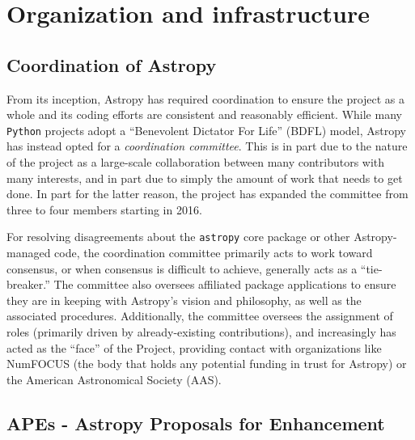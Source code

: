 \documentclass[modern]{aastex61}
\newcommand{\package}[1]{\texttt{#1}\xspace}
\newcommand{\python}{\package{Python}}
\newcommand{\astropy}{Astropy\xspace}
\newcommand{\astropypkg}{\package{astropy}}
\begin{document}
\section{Organization and infrastructure}
\label{sec:org}

\subsection{Coordination of Astropy}

From its inception, \astropy has required coordination to ensure the project
as a whole and its coding efforts are consistent and reasonably efficient.
While many \python projects adopt a ``Benevolent Dictator For Life'' (BDFL)
model, \astropy has instead opted for a \emph{coordination committee}.  This
is in part due to the nature of the project as a large-scale collaboration
between many contributors with many interests, and in part due to simply the
amount of work that needs to get done.  In part for the latter reason, the
project has expanded the committee from three to four members starting in
2016.

For resolving disagreements about the \astropypkg core package or other \astropy-managed code, the coordination committee primarily acts to work toward consensus, or when consensus is difficult to achieve, generally acts as a ``tie-breaker.''
The committee also oversees affiliated package applications to ensure they are in keeping with \astropy's vision and philosophy, as well as the associated procedures.
Additionally, the committee oversees the assignment of roles (primarily driven by already-existing contributions), and increasingly has acted as the ``face'' of the Project, providing contact with organizations like NumFOCUS (the body that holds any potential funding in trust for \astropy) or the American Astronomical Society (AAS).


\subsection{APEs - Astropy Proposals for Enhancement}
\end{document}
